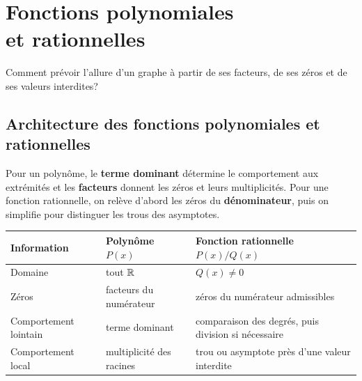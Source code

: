 \chapter[Polynômes et fonctions rationnelles]{Fonctions polynomiales\\et rationnelles}
\label{manual:chapter:05}

\begin{questionbox}
Comment prévoir l'allure d'un graphe à partir de ses facteurs, de ses zéros et de ses valeurs interdites?
\end{questionbox}

\section{Architecture des fonctions polynomiales et rationnelles}
\label{manual:section:05.01}

\begin{visualbox}
Pour un polynôme, le \textbf{terme dominant} détermine le comportement aux extrémités et les \textbf{facteurs} donnent les zéros et leurs multiplicités. Pour une fonction rationnelle, on relève d'abord les zéros du \textbf{dénominateur}, puis on simplifie pour distinguer les trous des asymptotes.
\end{visualbox}

\begin{center}
\begin{tabularx}{\textwidth}{@{}lYY@{}}
\toprule
Information & Polynôme $P(x)$ & Fonction rationnelle $P(x)/Q(x)$\\\midrule
Domaine & tout $\mathbb{R}$ & $Q(x)\ne0$\\
Zéros & facteurs du numérateur & zéros du numérateur admissibles\\
Comportement lointain & terme dominant & comparaison des degrés, puis division si nécessaire\\
Comportement local & multiplicité des racines & trou ou asymptote près d'une valeur interdite\\
\bottomrule
\end{tabularx}
\end{center}


